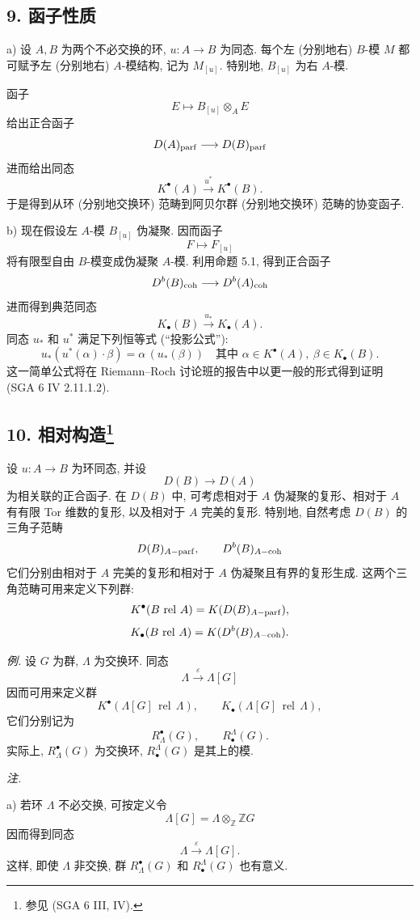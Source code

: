 \subsection*{9. 函子性质}

a) 设 $A,B$ 为两个不必交换的环, $u:A\to B$ 为同态. 每个左 (分别地右) $B$-模 $M$ 都可赋予左 (分别地右) $A$-模结构, 记为 $M_{[u]}$. 特别地, $B_{[u]}$ 为右 $A$-模.

函子
\[
E\longmapsto B_{[u]}\otimes_A E
\]
给出正合函子
\[
D(A)_{\mathrm{parf}}\longrightarrow D(B)_{\mathrm{parf}}
\]
进而给出同态
\[
K^\bullet(A)\xrightarrow{u^*}K^\bullet(B).
\]
于是得到从环 (分别地交换环) 范畴到阿贝尔群 (分别地交换环) 范畴的协变函子.

b) 现在假设左 $A$-模 $B_{[u]}$ 伪凝聚. 因而函子
\[
F\longmapsto F_{[u]}
\]
将有限型自由 $B$-模变成伪凝聚 $A$-模. 利用命题 5.1, 得到正合函子
\[
D^b(B)_{\mathrm{coh}}\longrightarrow D^b(A)_{\mathrm{coh}}
\]
进而得到典范同态
\[
K_\bullet(B)\xrightarrow{u_*}K_\bullet(A).
\]
同态 $u_*$ 和 $u^*$ 满足下列恒等式 (“投影公式”):
\[
u_*(u^*(\alpha)\cdot \beta)=\alpha\,(u_*(\beta))
\quad\text{其中 }\alpha\in K^\bullet(A),\ \beta\in K_\bullet(B).
\]
这一简单公式将在 Riemann--Roch 讨论班的报告中以更一般的形式得到证明 (SGA 6 IV 2.11.1.2).

\subsection*{10. 相对构造\footnote{参见 (SGA 6 III, IV).}}

设 $u:A\to B$ 为环同态, 并设
\[
D(B)\longrightarrow D(A)
\]
为相关联的正合函子. 在 $D(B)$ 中, 可考虑相对于 $A$ 伪凝聚的复形、相对于 $A$ 有有限 Tor 维数的复形, 以及相对于 $A$ 完美的复形. 特别地, 自然考虑 $D(B)$ 的三角子范畴
\[
D(B)_{A-\mathrm{parf}},\qquad D^b(B)_{A-\mathrm{coh}}
\]
它们分别由相对于 $A$ 完美的复形和相对于 $A$ 伪凝聚且有界的复形生成. 这两个三角范畴可用来定义下列群:
\[
K^\bullet(B\operatorname{\,rel\,}A)=K(D(B)_{A-\mathrm{parf}}),
\]
\[
K_\bullet(B\operatorname{\,rel\,}A)=K(D^b(B)_{A-\mathrm{coh}}).
\]

\emph{例.} 设 $G$ 为群, $\Lambda$ 为交换环. 同态
\[
\Lambda\xrightarrow{\varepsilon}\Lambda[G]
\]
因而可用来定义群
\[
K^\bullet(\Lambda[G]\operatorname{\,rel\,}\Lambda),\qquad
K_\bullet(\Lambda[G]\operatorname{\,rel\,}\Lambda),
\]
它们分别记为
\[
R^\bullet_\Lambda(G),\qquad R^\Lambda_\bullet(G).
\]
实际上, $R^\bullet_\Lambda(G)$ 为交换环, $R^\Lambda_\bullet(G)$ 是其上的模.

\emph{注.}

a) 若环 $\Lambda$ 不必交换, 可按定义令
\[
\Lambda[G]=\Lambda\otimes_{\mathbb Z}\mathbb ZG
\]
因而得到同态
\[
\Lambda\xrightarrow{\varepsilon}\Lambda[G].
\]
这样, 即使 $\Lambda$ 非交换, 群 $R^\bullet_\Lambda(G)$ 和 $R^\Lambda_\bullet(G)$ 也有意义.

